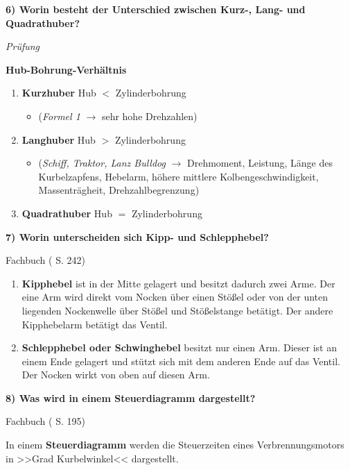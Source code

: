 \textbf{6) Worin besteht der Unterschied zwischen Kurz-, Lang- und
Quadrathuber?}

\emph{Prüfung}

\textbf{Hub-Bohrung-Verhältnis}

\begin{enumerate}
\def\labelenumi{(\arabic{enumi})}
\item
  \textbf{Kurzhuber} Hub $<$ Zylinderbohrung

  \begin{itemize}
  \item
    (\emph{Formel 1} $\to$ sehr hohe Drehzahlen)
  \end{itemize}
\item
  \textbf{Langhuber} Hub $>$ Zylinderbohrung

  \begin{itemize}
  \item
    (\emph{Schiff, Traktor, Lanz Bulldog} $\to$ Drehmoment, Leistung,
    Länge des Kurbelzapfens, Hebelarm, höhere mittlere
    Kolbengeschwindigkeit, Massenträgheit, Drehzahlbegrenzung)
  \end{itemize}
\item
  \textbf{Quadrathuber} Hub $=$ Zylinderbohrung
\end{enumerate}

\textbf{7) Worin unterscheiden sich Kipp- und Schlepphebel?}

Fachbuch (\textcite{brand:2020:fachkundeKfz} S. 242)

\begin{enumerate}
\def\labelenumi{(\arabic{enumi})}
\item
  \textbf{Kipphebel} ist in der Mitte gelagert und besitzt dadurch zwei
  Arme. Der eine Arm wird direkt vom Nocken über einen Stößel oder von
  der unten liegenden Nockenwelle über Stößel und Stößelstange betätigt.
  Der andere Kipphebelarm betätigt das Ventil.
\item
  \textbf{Schlepphebel oder Schwinghebel} besitzt nur einen Arm. Dieser
  ist an einem Ende gelagert und stützt sich mit dem anderen Ende auf
  das Ventil. Der Nocken wirkt von oben auf diesen Arm.
\end{enumerate}

\textbf{8) Was wird in einem Steuerdiagramm dargestellt?}

Fachbuch (\textcite{brand:2020:fachkundeKfz} S. 195)

In einem \textbf{Steuerdiagramm} werden die Steuerzeiten eines
Verbrennungsmotors in >>Grad Kurbelwinkel<< dargestellt.

